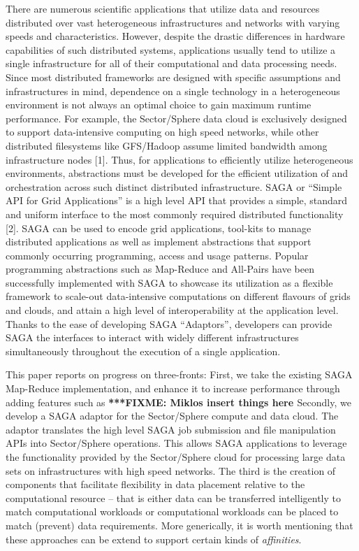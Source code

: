 \documentclass[a4paper,11pt]{article}
\newcommand{\fixme}[1]{ { \bf{ ***FIXME: #1 }} }
\newcommand{\fixme}[1]{}
\begin{document}
There are numerous scientific applications that utilize data and resources distributed over vast heterogeneous infrastructures and networks with varying speeds and characteristics. However, despite the drastic differences in hardware capabilities of such distributed systems, applications usually tend to utilize a single infrastructure for all of their computational and data processing needs. Since most distributed frameworks are designed with specific assumptions and infrastructures in mind, dependence on a single technology in a heterogeneous environment is not always an optimal choice to gain maximum runtime performance. For example, the Sector/Sphere data cloud is exclusively designed to support data-intensive computing on high speed networks, while other distributed filesystems like GFS/Hadoop assume limited bandwidth among infrastructure nodes [1]. Thus, for applications to efficiently utilize heterogeneous environments, abstractions must be developed for the efficient utilization of and orchestration across such distinct distributed infrastructure.  SAGA or “Simple API for Grid Applications” is a high level API that provides a simple, standard and uniform interface to the most commonly required distributed functionality [2]. SAGA can be used to encode grid applications, tool-kits to manage distributed applications as well as implement abstractions that support commonly occurring programming, access and usage patterns. Popular programming abstractions such as Map-Reduce and All-Pairs have been successfully implemented with SAGA to showcase its utilization as a flexible framework to scale-out data-intensive computations on different flavours of grids and clouds, and attain a high level of interoperability at the application level. Thanks to the ease of developing SAGA “Adaptors”, developers can provide SAGA the interfaces to interact with widely different infrastructures simultaneously throughout the execution of a single application.

This paper reports on progress on three-fronts: First, we take the existing SAGA Map-Reduce implementation, and enhance it to increase performance through adding features such as \fixme{Miklos insert things here} Secondly, we develop a SAGA adaptor for the Sector/Sphere compute and data cloud. The adaptor translates the high level SAGA job submission and file manipulation APIs into Sector/Sphere operations. This allows SAGA applications to leverage the functionality provided by the Sector/Sphere cloud for processing large data sets on infrastructures with high speed networks.  The third is the creation of components that facilitate flexibility in data placement relative to the computational resource -- that is either data can be transferred intelligently to match computational workloads or computational workloads can be placed to match (prevent) data requirements. More generically, it is worth mentioning that these approaches can be extend to support certain kinds of {\it affinities}.  
\end{document}
